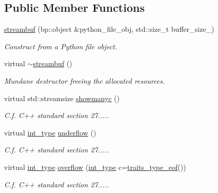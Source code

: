 \subsection*{Public Member Functions}
\begin{DoxyCompactItemize}
\item 
\hyperlink{classecto_1_1py_1_1streambuf_a363d9b87292423903bc5fe94782ad6e0}{streambuf} (bp\+::object \&python\+\_\+file\+\_\+obj, std\+::size\+\_\+t buffer\+\_\+size\+\_)
\begin{DoxyCompactList}\small\item\em Construct from a Python file object. \end{DoxyCompactList}\item 
virtual \hyperlink{classecto_1_1py_1_1streambuf_a3a63f6d4610731b218bcdca5603a51ef}{$\sim$streambuf} ()
\begin{DoxyCompactList}\small\item\em Mundane destructor freeing the allocated resources. \end{DoxyCompactList}\item 
virtual std\+::streamsize \hyperlink{classecto_1_1py_1_1streambuf_aba2bcdbeeee00b043f918e60f86ebdd4}{showmanyc} ()
\begin{DoxyCompactList}\small\item\em C.\+f. C++ standard section 27..... \end{DoxyCompactList}\item 
virtual \hyperlink{classecto_1_1py_1_1streambuf_a1bfd3d3f54b7b91a5ea54f980436a617}{int\+\_\+type} \hyperlink{classecto_1_1py_1_1streambuf_adf2601f0f067538a980dced85e8f8d2e}{underflow} ()
\begin{DoxyCompactList}\small\item\em C.\+f. C++ standard section 27..... \end{DoxyCompactList}\item 
virtual \hyperlink{classecto_1_1py_1_1streambuf_a1bfd3d3f54b7b91a5ea54f980436a617}{int\+\_\+type} \hyperlink{classecto_1_1py_1_1streambuf_a6eb250e56b6bbc9345b4f00981e4182f}{overflow} (\hyperlink{classecto_1_1py_1_1streambuf_a1bfd3d3f54b7b91a5ea54f980436a617}{int\+\_\+type} c=\hyperlink{classecto_1_1py_1_1streambuf_ab4446bbe746f4d3713c15492d798872e}{traits\+\_\+type\+\_\+eof}())
\begin{DoxyCompactList}\small\item\em C.\+f. C++ standard section 27..... \end{DoxyCompactList}\item 

\end{DoxyCompactItemize}
